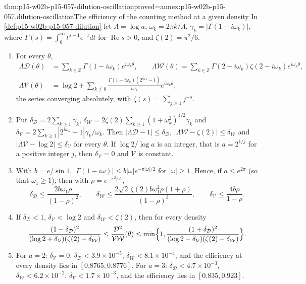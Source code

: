 \begin{hbtheorem}{thm:p15-w02b-p15-057-dilution-oscillation}{proved=annex:p15-w02b-p15-057.dilution-oscillation}{The efficiency of the counting method at a given density}
In \cref{def:p15-w02b-p15-057-dilution} let \(\Lambda=\log a\),
\(\omega_k=2\pi k/\Lambda\), \(\gamma_k=|\Gamma(1-i\omega_k)|\), where
\(\Gamma(s)=\int_0^\infty t^{s-1}e^{-t}dt\) for \(\operatorname{Re}s>0\),
and \(\zeta(2)=\pi^2/6\).
\begin{enumerate}
\item For every \(\theta\),
 \[
 \begin{aligned}
  \Lambda\mathcal D(\theta)&=\sum_{k\in\mathbb Z}\Gamma(1-i\omega_k)
   e^{i\omega_k\theta},\qquad
  \Lambda\mathcal W(\theta)=\sum_{k\in\mathbb Z}\Gamma(2-i\omega_k)
   \zeta(2-i\omega_k)e^{i\omega_k\theta},\\
  \Lambda\mathcal V(\theta)&=\log2+\sum_{k\neq0}
   \frac{\Gamma(1-i\omega_k)(2^{i\omega_k}-1)}{i\omega_k}e^{i\omega_k\theta},
 \end{aligned}
 \]
 the series converging absolutely, with \(\zeta(s)=\sum_{j\geq1}j^{-s}\).
\item Put \(\delta_{\mathcal D}=2\sum_{k\geq1}\gamma_k\),
 \(\delta_{\mathcal W}=2\zeta(2)\sum_{k\geq1}(1+\omega_k^2)^{1/2}\gamma_k\)
 and \(\delta_{\mathcal V}=2\sum_{k\geq1}|2^{i\omega_k}-1|\gamma_k/\omega_k\).
 Then \(|\Lambda\mathcal D-1|\leq\delta_{\mathcal D}\),
 \(|\Lambda\mathcal W-\zeta(2)|\leq\delta_{\mathcal W}\) and
 \(|\Lambda\mathcal V-\log2|\leq\delta_{\mathcal V}\) for every \(\theta\).
 If \(\log2/\log a\) is an integer, that is \(a=2^{1/j}\) for a positive
 integer \(j\), then \(\delta_{\mathcal V}=0\) and \(\mathcal V\) is
 constant.
\item With \(b=e/\sin1\), \(|\Gamma(1-i\omega)|\leq
 b|\omega|e^{-\pi|\omega|/2}\) for \(|\omega|\geq1\). Hence, if
 \(a\leq e^{2\pi}\) (so that \(\omega_1\geq1\)), then with
 \(\rho=e^{-\pi^2/\Lambda}\),
 \[
  \delta_{\mathcal D}\leq\frac{2b\omega_1\rho}{(1-\rho)^2},\qquad
  \delta_{\mathcal W}\leq\frac{2\sqrt2\,\zeta(2)b\omega_1^2\rho(1+\rho)}{(1-\rho)^3},
  \qquad
  \delta_{\mathcal V}\leq\frac{4b\rho}{1-\rho}.
 \]
\item If \(\delta_{\mathcal D}<1\), \(\delta_{\mathcal V}<\log2\) and
 \(\delta_{\mathcal W}<\zeta(2)\), then for every density
 \[
  \frac{(1-\delta_{\mathcal D})^2}{(\log2+\delta_{\mathcal V})
  (\zeta(2)+\delta_{\mathcal W})}\leq
  \frac{\mathcal D^2}{\mathcal V\mathcal W}(\theta)\leq
  \min\Bigl\{1,\frac{(1+\delta_{\mathcal D})^2}{(\log2-\delta_{\mathcal V})
  (\zeta(2)-\delta_{\mathcal W})}\Bigr\}.
 \]
\item For \(a=2\): \(\delta_{\mathcal V}=0\),
 \(\delta_{\mathcal D}<3.9\times10^{-5}\),
 \(\delta_{\mathcal W}<8.1\times10^{-4}\), and the efficiency at every
 density lies in \([0.8765,0.8776]\). For \(a=3\):
 \(\delta_{\mathcal D}<4.7\times10^{-3}\),
 \(\delta_{\mathcal W}<6.2\times10^{-2}\),
 \(\delta_{\mathcal V}<1.7\times10^{-3}\), and the efficiency lies in
 \([0.835,0.923]\).
\end{enumerate}
\end{hbtheorem}

